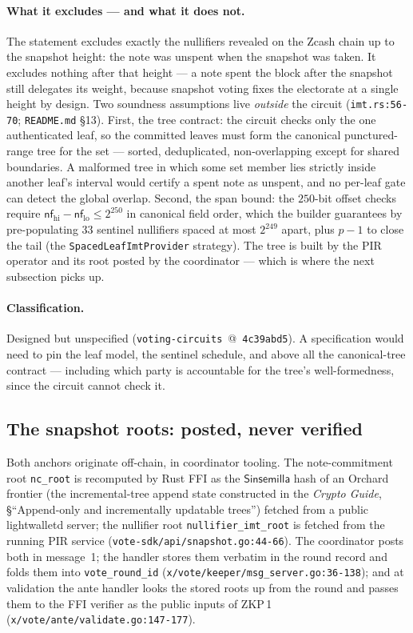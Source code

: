 \documentclass[11pt,a4paper]{article}
\theoremstyle{definition}
\newcommand{\nfsym}{\mathsf{nf}}
\newcommand{\Sinsemilla}{\ensuremath{\mathsf{Sinsemilla}}}
\begin{document}
\paragraph{What it excludes --- and what it does not.} The statement
excludes exactly the nullifiers revealed on the Zcash chain up to the
snapshot height: the note was unspent when the snapshot was taken. It
excludes nothing after that height --- a note spent the block after the
snapshot still delegates its weight, because snapshot voting fixes the
electorate at a single height by design. Two soundness assumptions live
\emph{outside} the circuit (\texttt{imt.rs:56-70};
\texttt{README.md} \S13). First, the tree contract: the circuit checks
only the one authenticated leaf, so the committed leaves must form the
canonical punctured-range tree for the set --- sorted, deduplicated,
non-overlapping except for shared boundaries. A malformed tree in which
some set member lies strictly inside another leaf's interval would certify
a spent note as unspent, and no per-leaf gate can detect the global
overlap. Second, the span bound: the $250$-bit offset checks require
$\nfsym_{\mathrm{hi}} - \nfsym_{\mathrm{lo}} \le 2^{250}$ in canonical
field order, which the builder guarantees by pre-populating $33$ sentinel
nullifiers spaced at most $2^{249}$ apart, plus $p-1$ to close the tail
(the \texttt{SpacedLeafImtProvider} strategy). The tree is built by the
PIR operator and its root posted by the coordinator --- which is where the
next subsection picks up.

\paragraph{Classification.} Designed but unspecified
(\texttt{voting-circuits}~@~\texttt{4c39abd5}). A specification would need
to pin the leaf model, the sentinel schedule, and above all the
canonical-tree contract --- including which party is accountable for the
tree's well-formedness, since the circuit cannot check it.

\subsection{The snapshot roots: posted, never verified}
\label{sec:vote-snapshot}

Both anchors originate off-chain, in coordinator tooling. The
note-commitment root \texttt{nc\_root} is recomputed by Rust FFI as the
\Sinsemilla{} hash of an Orchard frontier (the incremental-tree append
state constructed in the \emph{Crypto Guide}, \S``Append-only and
incrementally updatable trees'') fetched from a public lightwalletd
server; the nullifier root \texttt{nullifier\_imt\_root} is
fetched from the running PIR service
(\texttt{vote-sdk/api/snapshot.go:44-66}). The coordinator posts both in
message~1; the handler stores them verbatim in the round record and folds
them into \texttt{vote\_round\_id}
(\texttt{x/vote/keeper/msg\_server.go:36-138}); and at validation the ante
handler looks the stored roots up from the round and passes them to the
FFI verifier as the public inputs of ZKP\,1
(\texttt{x/vote/ante/validate.go:147-177}).
\end{document}
